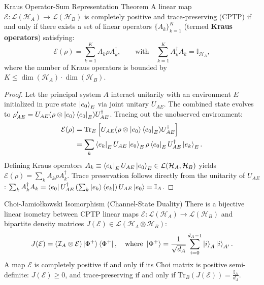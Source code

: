\begin{theorembox}{Kraus Operator-Sum Representation Theorem}
A linear map $\mathcal{E}: \mathcal{L}(\mathcal{H}_A) \to \mathcal{L}(\mathcal{H}_B)$ is completely positive and trace-preserving (CPTP) if and only if there exists a set of linear operators $\{A_k\}_{k=1}^K$ (termed \textbf{Kraus operators}) satisfying:
\begin{equation}
    \mathcal{E}(\rho) = \sum_{k=1}^K A_k \rho A_k^\dagger, \qquad \text{with} \quad \sum_{k=1}^K A_k^\dagger A_k = \mathbb{I}_{\mathcal{H}_A},
    \label{eq:kraus_representation_app_v2}
\end{equation}
where the number of Kraus operators is bounded by $K \le \dim(\mathcal{H}_A) \cdot \dim(\mathcal{H}_B)$.
\end{theorembox}

\begin{proof}
Let the principal system $A$ interact unitarily with an environment $E$ initialized in pure state $\ket{e_0}_E$ via joint unitary $U_{AE}$. The combined state evolves to $\rho_{AE}' = U_{AE} (\rho \otimes \ket{e_0}\bra{e_0}_E) U_{AE}^\dagger$. Tracing out the unobserved environment:
\begin{align}
    \mathcal{E}(\rho) &= \text{Tr}_E\left[ U_{AE} (\rho \otimes \ket{e_0}\bra{e_0}_E) U_{AE}^\dagger \right] \nonumber \\
    &= \sum_k \bra{e_k}_E U_{AE} \ket{e_0}_E \rho \bra{e_0}_E U_{AE}^\dagger \ket{e_k}_E.
\end{align}
Defining Kraus operators $A_k \equiv \bra{e_k}_E U_{AE} \ket{e_0}_E \in \mathcal{L}(\mathcal{H}_A, \mathcal{H}_B)$ yields $\mathcal{E}(\rho) = \sum_k A_k \rho A_k^\dagger$. Trace preservation follows directly from the unitarity of $U_{AE}$: $\sum_k A_k^\dagger A_k = \bra{e_0} U_{AE}^\dagger \left( \sum_k \ket{e_k}\bra{e_k} \right) U_{AE} \ket{e_0} = \mathbb{I}_A$.
\end{proof}

\begin{theorembox}{Choi-Jamio\l kowski Isomorphism (Channel-State Duality)}
There is a bijective linear isometry between CPTP linear maps $\mathcal{E}: \mathcal{L}(\mathcal{H}_A) \to \mathcal{L}(\mathcal{H}_B)$ and bipartite density matrices $J(\mathcal{E}) \in \mathcal{L}(\mathcal{H}_A \otimes \mathcal{H}_B)$:
\begin{equation}
    J(\mathcal{E}) = (\mathcal{I}_A \otimes \mathcal{E}) \ket{\Phi^+}\bra{\Phi^+}, \quad \text{where } \ket{\Phi^+} = \frac{1}{\sqrt{d_A}} \sum_{i=0}^{d_A - 1} \ket{i}_A \ket{i}_{A'}.
\end{equation}
A map $\mathcal{E}$ is completely positive if and only if its Choi matrix is positive semi-definite: $J(\mathcal{E}) \ge 0$, and trace-preserving if and only if $\text{Tr}_B(J(\mathcal{E})) = \frac{\mathbb{I}_A}{d_A}$.
\end{theorembox}

